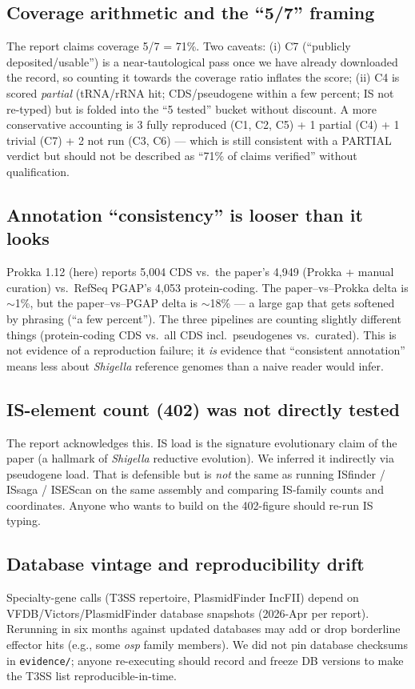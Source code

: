 \documentclass[11pt,letterpaper]{article}
\begin{document}
\subsection{Coverage arithmetic and the ``5/7'' framing}
The report claims coverage 5/7 = 71\%. Two caveats: (i) C7 (``publicly deposited/usable'') is a near-tautological pass once we have already downloaded the record, so counting it towards the coverage ratio inflates the score; (ii) C4 is scored \emph{partial} (tRNA/rRNA hit; CDS/pseudogene within a few percent; IS not re-typed) but is folded into the ``5 tested'' bucket without discount. A more conservative accounting is 3 fully reproduced (C1, C2, C5) + 1 partial (C4) + 1 trivial (C7) + 2 not run (C3, C6) --- which is still consistent with a PARTIAL verdict but should not be described as ``71\% of claims verified'' without qualification.

\subsection{Annotation ``consistency'' is looser than it looks}
Prokka 1.12 (here) reports 5{,}004 CDS vs.\ the paper's 4{,}949 (Prokka + manual curation) vs.\ RefSeq PGAP's 4{,}053 protein-coding. The paper--vs--Prokka delta is $\sim$1\%, but the paper--vs--PGAP delta is $\sim$18\% --- a large gap that gets softened by phrasing (``a few percent''). The three pipelines are counting slightly different things (protein-coding CDS vs.\ all CDS incl.\ pseudogenes vs.\ curated). This is not evidence of a reproduction failure; it \emph{is} evidence that ``consistent annotation'' means less about \textit{Shigella} reference genomes than a naive reader would infer.

\subsection{IS-element count (402) was not directly tested}
The report acknowledges this. IS load is the signature evolutionary claim of the paper (a hallmark of \textit{Shigella} reductive evolution). We inferred it indirectly via pseudogene load. That is defensible but is \emph{not} the same as running ISfinder / ISsaga / ISEScan on the same assembly and comparing IS-family counts and coordinates. Anyone who wants to build on the 402-figure should re-run IS typing.

\subsection{Database vintage and reproducibility drift}
Specialty-gene calls (T3SS repertoire, PlasmidFinder IncFII) depend on VFDB/Victors/PlasmidFinder database snapshots (2026-Apr per report). Rerunning in six months against updated databases may add or drop borderline effector hits (e.g., some \textit{osp} family members). We did not pin database checksums in \texttt{evidence/}; anyone re-executing should record and freeze DB versions to make the T3SS list reproducible-in-time.
\end{document}
